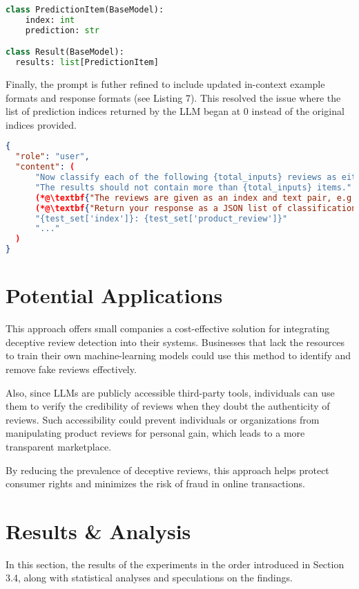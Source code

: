 \documentclass[sigconf, nonacm]{acmart}
\theoremstyle{definition}
\begin{document}
\begin{lstlisting}[language=Python, caption={Final Response Format}]
class PredictionItem(BaseModel):
    index: int
    prediction: str

class Result(BaseModel):
  results: list[PredictionItem]
\end{lstlisting}

Finally, the prompt is futher refined to include updated in-context example formats and response formats (see Listing 7). This resolved the issue where the list of prediction indices returned by the LLM began at 0 instead of the original indices provided.

\begin{lstlisting}[language=json, caption={Final User Messages}]
{
  "role": "user",
  "content": (
      "Now classify each of the following {total_inputs} reviews as either 'truthful' or 'deceptive'. "
      "The results should not contain more than {total_inputs} items."
      (*@\textbf{"The reviews are given as an index and text pair, e.g. '123: This is a review.'"}@*)
      (*@\textbf{"Return your response as a JSON list of classifications paired with an index, e.g. [{'123': 'truthful'}, {'456': 'deceptive'}, ...]."}@*)
      "{test_set['index']}: {test_set['product_review']}"
      "..."
  )
}
\end{lstlisting}

\section{Potential Applications}

This approach offers small companies a cost-effective solution for integrating deceptive review detection into their systems. Businesses that lack the resources to train their own machine-learning models could use this method to identify and remove fake reviews effectively.

Also, since LLMs are publicly accessible third-party tools, individuals can use them to verify the credibility of reviews when they doubt the authenticity of reviews. Such accessibility could prevent individuals or organizations from manipulating product reviews for personal gain, which leads to a more transparent marketplace.

By reducing the prevalence of deceptive reviews, this approach helps protect consumer rights and minimizes the risk of fraud in online transactions.

\section{Results \& Analysis}
In this section, the results of the experiments in the order introduced in Section 3.4, along with statistical analyses and speculations on the findings.
\end{document}
